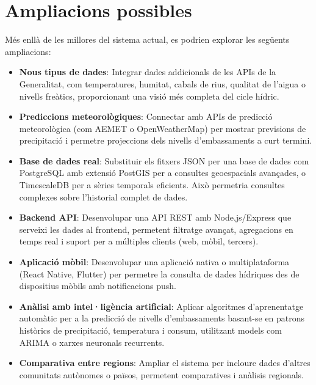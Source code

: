\section{Ampliacions possibles}

Més enllà de les millores del sistema actual, es podrien explorar les següents ampliacions:

\begin{itemize}
    \item \textbf{Nous tipus de dades}: Integrar dades addicionals de les APIs de la Generalitat, com temperatures, humitat, cabals de rius, qualitat de l'aigua o nivells freàtics, proporcionant una visió més completa del cicle hídric.
    
    \item \textbf{Prediccions meteorològiques}: Connectar amb APIs de predicció meteorològica (com AEMET o OpenWeatherMap) per mostrar previsions de precipitació i permetre projeccions dels nivells d'embassaments a curt termini.
    
    \item \textbf{Base de dades real}: Substituir els fitxers JSON per una base de dades com PostgreSQL amb extensió PostGIS per a consultes geoespacials avançades, o TimescaleDB per a sèries temporals eficients. Això permetria consultes complexes sobre l'historial complet de dades.
    
    \item \textbf{Backend API}: Desenvolupar una API REST amb Node.js/Express que serveixi les dades al frontend, permetent filtratge avançat, agregacions en temps real i suport per a múltiples clients (web, mòbil, tercers).
    
    \item \textbf{Aplicació mòbil}: Desenvolupar una aplicació nativa o multiplataforma (React Native, Flutter) per permetre la consulta de dades hídriques des de dispositius mòbils amb notificacions push.
    
    \item \textbf{Anàlisi amb intel·ligència artificial}: Aplicar algoritmes d'aprenentatge automàtic per a la predicció de nivells d'embassaments basant-se en patrons històrics de precipitació, temperatura i consum, utilitzant models com ARIMA o xarxes neuronals recurrents.
    
    \item \textbf{Comparativa entre regions}: Ampliar el sistema per incloure dades d'altres comunitats autònomes o països, permetent comparatives i anàlisis regionals.
\end{itemize}

